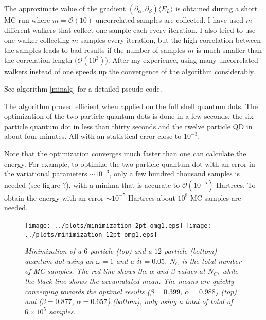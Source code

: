\documentclass[a4paper,10pt,twocolumn]{article} %
\newcommand{\expec}[1]{\langle{}{#1}\rangle{}}
\begin{document}
The approximate value of the gradient $\left({\partial_\alpha},{\partial_\beta}\right)\expec{E_L}$ is obtained during a short MC run where $m=\mathcal O (10)$ uncorrelated samples are 
collected. I have used $m$ different walkers that collect one sample each every iteration. 
I also tried to use one walker collecting $m$ samples every iteration, but %
the high correlation between the samples leads to bad results if the number of samples $m$ is much smaller than the correlation length ($\mathcal O(10^3)$). 
After my experience, using many uncorrelated walkers instead of one speeds up the convergence of the algorithm considerably. %

See algorithm \ref{minalg} for a detailed pseudo code.

The algorithm proved efficient when applied on the full shell quantum dots.%
The optimization of the two particle quantum dots is done in a few seconds, the six particle quantum dot in less than thirty seconds and the twelve particle QD in about four minutes.
All with an statistical error close to $10^{-3}$.

Note that the optimization converges much faster than one can calculate the energy. For example, to optimize the two particle quantum dot with an error in the variational parameters 
$\sim10^{-3}$, only a few hundred thousand samples is needed (see figure ?), with a minima that is accurate to $\mathcal O (10^{-5})$ Hartrees. 
To obtain the energy with an error $\sim 10^{-5}$ Hartrees about $10^8$ MC-samples are needed.

\begin{figure}[h!]
\begin{center}
\caption{{\it%
	Minimization of a $6$ particle (top) and a $12$ particle (bottom) quantum dot using an $\omega = 1$ and a $\delta t=0.05$. $N_C$ is the total number of MC-samples. 
	The red line shows the $\alpha$ and $\beta$ values at $N_C$, while the black line shows the accumulated mean.
	The means are quickly converging towards the optimal results ($\beta=0.399$, $\alpha=0.988$) (top) and ($\beta=0.877$, $\alpha=0.657$) (bottom), 
	only using a total of total of $6\times10^5$ samples. }}
\vspace{-.3cm}
	\texttt{[image: ../plots/minimization\_2pt\_omg1.eps]}
	\texttt{[image: ../plots/minimization\_12pt\_omg1.eps]}
\end{center}
\vspace{-.8cm}
\end{figure}
\end{document}
